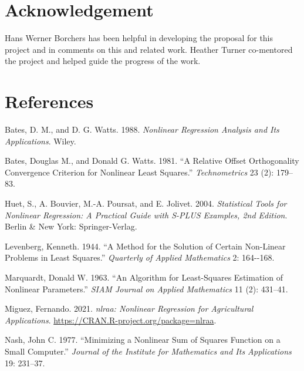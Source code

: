 \documentclass[
]{article}
\newlength{\cslhangindent}
\newlength{\cslentryspacingunit} %
\newenvironment{CSLReferences}[2] %
 {%
  \setlength{\parindent}{0pt}
  \ifodd #1
  \let\oldpar\par
  \def\par{\hangindent=\cslhangindent\oldpar}
  \fi
  \setlength{\parskip}{#2\cslentryspacingunit}
 }%
 {}
\begin{document}
\hypertarget{acknowledgement}{%
\section{Acknowledgement}\label{acknowledgement}}

Hans Werner Borchers has been helpful in developing the proposal for
this project and in comments on this and related work. Heather Turner
co-mentored the project and helped guide the progress of the work.

\hypertarget{references}{%
\section*{References}\label{references}}

\hypertarget{refs}{}
\begin{CSLReferences}{1}{0}
\leavevmode{}%
Bates, D. M., and D. G. Watts. 1988. \emph{Nonlinear Regression Analysis
and Its Applications}. Wiley.

\leavevmode{}%
Bates, Douglas M., and Donald G. Watts. 1981. {``A Relative Offset
Orthogonality Convergence Criterion for Nonlinear Least Squares.''}
\emph{Technometrics} 23 (2): 179--83.

\leavevmode{}%
Huet, S., A. Bouvier, M.-A. Poursat, and E. Jolivet. 2004.
\emph{Statistical Tools for Nonlinear Regression: A Practical Guide with
{S-PLUS} Examples, 2nd Edition}. Berlin \& New York: Springer-Verlag.

\leavevmode{}%
Levenberg, Kenneth. 1944. {``A Method for the Solution of Certain
Non-Linear Problems in Least Squares.''} \emph{Quarterly of Applied
Mathematics} 2: 164-\/-168.

\leavevmode{}%
Marquardt, Donald W. 1963. {``{An Algorithm for Least-Squares Estimation
of Nonlinear Parameters}.''} \emph{SIAM Journal on Applied Mathematics}
11 (2): 431--41.

\leavevmode{}%
Miguez, Fernando. 2021. \emph{{nlraa: Nonlinear Regression for
Agricultural Applications}}.
\url{https://CRAN.R-project.org/package=nlraa}.

\leavevmode{}%
Nash, John C. 1977. {``Minimizing a Nonlinear Sum of Squares Function on
a Small Computer.''} \emph{Journal of the Institute for Mathematics and
Its Applications} 19: 231--37.


\end{CSLReferences}
\end{document}
